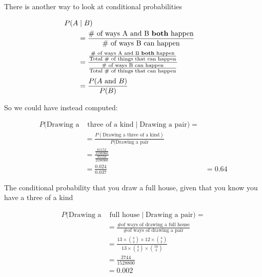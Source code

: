 %
\begin{frame}

There is another way to look at conditional probabilities

\begin{align*}
P(A & \mid B) & \\
%
&= \frac{\text{\# of ways A and B \textbf{both} happen}}{\text{\#
of ways B can happen}} \\[0.5ex]
%
&= \frac{\frac{\text{\# of ways A and B \textbf{both} happen}}{\text{Total \# of
things that can happen}}}{\frac{\text{\# of ways B can happen}}{\text{Total \# of
things that can happen}}} \\[0.5ex]
%
&= \frac{P(A \text{ and } B)}{P(B)}
\end{align*}

\end{frame}
%

%
\begin{frame}

So we could have instead computed:

\begin{align*}
P(\text{Drawing a} & \text{ three of a kind} \mid \text{Drawing a pair}) = \\
%
&= \frac{P(\text{Drawing a three of a kind})}{P(\text{Drawing a pair}} \\
%
&= \frac{\frac{61152}{2598960}}{\frac{95550}{2598960}} \\
%
&= \frac{0.024}{0.037}
%
&= 0.64
\end{align*}

\end{frame}
%

%
\begin{frame}

The conditional probability that you draw a full house, given that you know you
have a three of a kind

\begin{align*}
P(\text{Drawing a} & \text{ full house} \mid \text{Drawing a pair}) = \\
%
&= \frac{\text{\# of ways of drawing a full house}}{\text{\# of ways of drawing
a pair}} \\
%
&= \frac{ 13 \times {{4}\choose{3}} \times 12 \times {{4}\choose{2}} } {13
\times {{4}\choose{2}} \times {{50}\choose{3}}} \\
%
%
&= \frac{3744}{1528800} \\
%
&= 0.002
\end{align*}

\end{frame}
